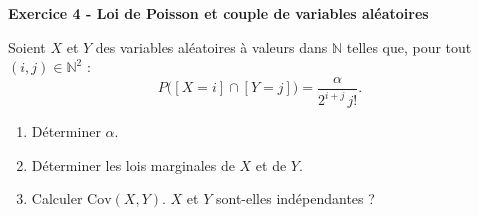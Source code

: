 \documentclass[12pt,a4paper]{article}
\begin{document}
\begin{boiteexercice}
\textbf{Exercice 4 - Loi de Poisson et couple de variables aléatoires}\niveau{\difficile}

Soient $X$ et $Y$ des variables aléatoires à valeurs dans $\mathbb{N}$ telles que, pour tout $(i,j) \in \mathbb{N}^2$ :
\[
P\bigl([X=i] \cap [Y=j]\bigr) = \frac{\alpha}{2^{i+j}\,j!}.
\]
\begin{enumerate}
  \item Déterminer $\alpha$.
  \item Déterminer les lois marginales de $X$ et de $Y$.
  \item Calculer $\mathrm{Cov}(X,Y)$. $X$ et $Y$ sont-elles indépendantes ?
\end{enumerate}
\end{boiteexercice}
\end{document}
